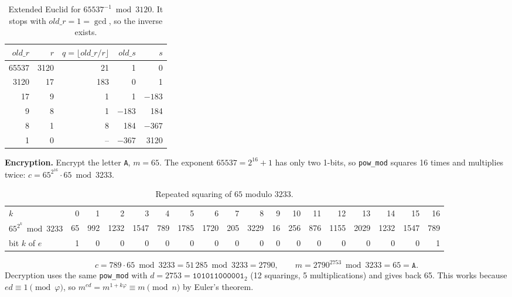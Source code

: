 \begin{table}[H]
\centering
\small
\begin{tabular}{@{}r r r r r@{}}
\toprule
$\mathit{old\_r}$ & $r$ & $q = \lfloor \mathit{old\_r} / r \rfloor$ & $\mathit{old\_s}$ & $s$ \\
\midrule
65537 & 3120 & 21  & 1    & 0 \\
3120  & 17   & 183 & 0    & 1 \\
17    & 9    & 1   & 1    & $-183$ \\
9     & 8    & 1   & $-183$ & 184 \\
8     & 1    & 8   & 184  & $-367$ \\
1     & 0    & --  & $-367$ & 3120 \\
\bottomrule
\end{tabular}
\caption{Extended Euclid for $65537^{-1} \bmod 3120$. It stops with $\mathit{old\_r} = 1 = \gcd$, so the inverse exists.}
\label{tab:toyeuclid}
\end{table}

\textbf{Encryption.} Encrypt the letter \texttt{A}, $m = 65$. The exponent
$65537 = 2^{16} + 1$ has only two 1-bits, so \texttt{pow\_mod} squares 16 times
and multiplies twice: $c = 65^{2^{16}} \cdot 65 \bmod 3233$.

\begin{table}[H]
\centering
\small
\setlength{\tabcolsep}{3.2pt}
\begin{tabular}{@{}l *{17}{r}@{}}
\toprule
$k$ & 0 & 1 & 2 & 3 & 4 & 5 & 6 & 7 & 8 & 9 & 10 & 11 & 12 & 13 & 14 & 15 & 16 \\
$65^{2^k} \bmod 3233$ & 65 & 992 & 1232 & 1547 & 789 & 1785 & 1720 & 205 & 3229 & 16 & 256 & 876 & 1155 & 2029 & 1232 & 1547 & 789 \\
bit $k$ of $e$ & 1 & 0 & 0 & 0 & 0 & 0 & 0 & 0 & 0 & 0 & 0 & 0 & 0 & 0 & 0 & 0 & 1 \\
\bottomrule
\end{tabular}
\caption{Repeated squaring of $65$ modulo $3233$.}
\end{table}

\[
  c = 789 \cdot 65 \bmod 3233 = 51\,285 \bmod 3233 = 2790, \qquad
  m = 2790^{2753} \bmod 3233 = 65 = \texttt{A}.
\]
Decryption uses the same \texttt{pow\_mod} with $d = 2753 =
\texttt{101011000001}_2$ (12 squarings, 5 multiplications) and gives back 65.
This works because $e d \equiv 1 \pmod{\varphi}$, so
$m^{ed} = m^{1 + k\varphi} \equiv m \pmod n$ by Euler's theorem.

